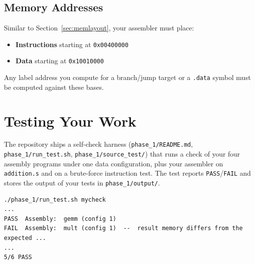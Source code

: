 \documentclass[11pt]{article}
\begin{document}
\subsection{Memory Addresses}
Similar to Section~\ref{sec:memlayout}, your assembler must place:
\begin{itemize}
  \item \textbf{Instructions} starting at \texttt{0x00400000}
  \item \textbf{Data} starting at \texttt{0x10010000}
\end{itemize}
Any label address you compute for a branch/jump target or a
\texttt{.data} symbol must be computed against these bases.

\section{Testing Your Work}
The repository ships a self-check harness (\texttt{phase\_1/\allowbreak README.md},
\texttt{phase\_1/\allowbreak run\_test.sh}, \texttt{phase\_1/\allowbreak source\_test/}) that runs a check of your four assembly programs under one data configuration,
plus your assembler on \texttt{addition.s} and on a brute-force instruction test.
The test reports \texttt{PASS}/\texttt{FAIL} and stores the output of your tests in \texttt{phase\_1/output/}.
\begin{lstlisting}[language={}]
./phase_1/run_test.sh mycheck
...
PASS  Assembly:  gemm (config 1)
FAIL  Assembly:  mult (config 1)  --  result memory differs from the expected ...
...
5/6 PASS
\end{lstlisting}
\end{document}
